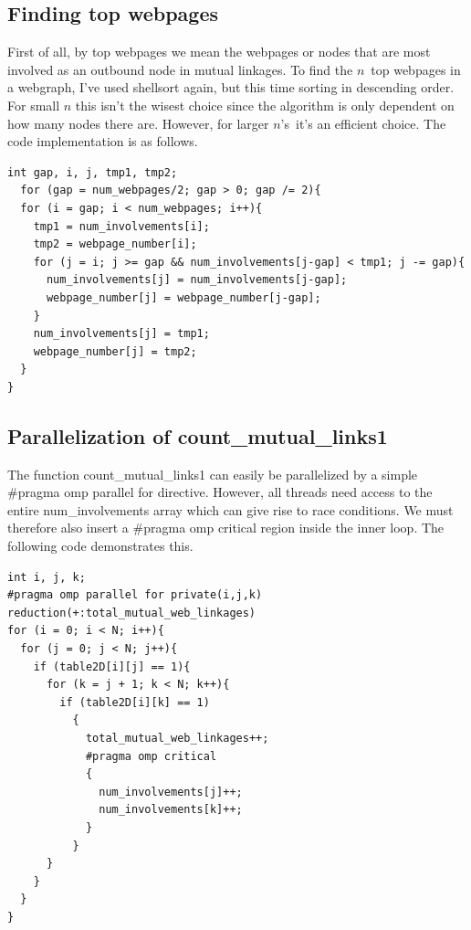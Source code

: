 \documentclass[english,notitlepage, reprint]{revtex4-1}  %
\begin{document}
\subsection*{Finding top webpages}
First of all, by top webpages we mean the webpages or nodes that are most involved as an outbound node in mutual linkages. To find the $n$ top webpages in a webgraph, I've used shellsort again, but this time sorting in descending order. For small $n$ this isn't the wisest choice since the algorithm is only dependent on how many nodes there are. However, for larger $n$'s it's an efficient choice. The code implementation is as follows.
\begin{lstlisting}[style=customc]
int gap, i, j, tmp1, tmp2;
  for (gap = num_webpages/2; gap > 0; gap /= 2){
  for (i = gap; i < num_webpages; i++){
    tmp1 = num_involvements[i];
    tmp2 = webpage_number[i];
    for (j = i; j >= gap && num_involvements[j-gap] < tmp1; j -= gap){
      num_involvements[j] = num_involvements[j-gap];
      webpage_number[j] = webpage_number[j-gap];
    }
    num_involvements[j] = tmp1;
    webpage_number[j] = tmp2;
  }
}
\end{lstlisting}

\subsection*{Parallelization of count\_mutual\_links1}
The function count\_mutual\_links1 can easily be parallelized by a simple \#pragma omp parallel for directive. However, all threads need access to the entire num\_involvements array which can give rise to race conditions. We must therefore also insert a \#pragma omp critical region inside the inner loop. The following code demonstrates this.
\begin{lstlisting}[style=customc]
int i, j, k;
#pragma omp parallel for private(i,j,k) reduction(+:total_mutual_web_linkages)
for (i = 0; i < N; i++){
  for (j = 0; j < N; j++){
    if (table2D[i][j] == 1){
      for (k = j + 1; k < N; k++){
        if (table2D[i][k] == 1)
          {
            total_mutual_web_linkages++;
            #pragma omp critical
            {
              num_involvements[j]++;
              num_involvements[k]++;
            }
          }
      }
    }
  }
}
\end{lstlisting}
\end{document}
